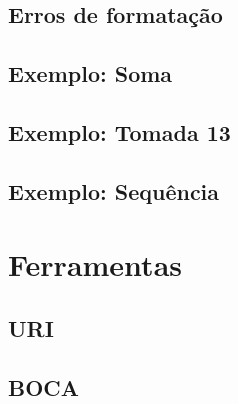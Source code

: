 \documentclass[utf8, usepdftitle=false, svgnames, color={table, fixpdftex, hyperref, fixinclude, xcdraw}, t, brazil]{beamer}
\begin{document}
			\subsection{Erros de formatação}
			
			
			\subsection{Exemplo: Soma}
			

			\subsection{Exemplo: Tomada 13}
			

			\subsection{Exemplo: Sequência}
			

			
		\section{Ferramentas}
			\subsection{URI}
			

			\subsection{BOCA}
			
\end{document}
